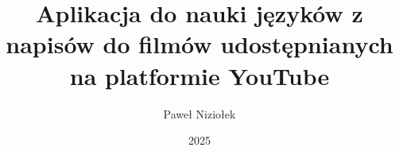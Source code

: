 \documentclass[thesis=inz]{TemplateCore/Dyplom}
\title{Aplikacja do nauki języków z napisów do filmów udostępnianych na platformie YouTube
}
\author{Paweł Niziołek}
\date{2025}
\begin{document}
\frontpages


\bibliografia


\clearpage
\clearpage
\listoffigures
\clearpage
\listoftables

\clearpage
\lstlistoflistings
\end{document}
